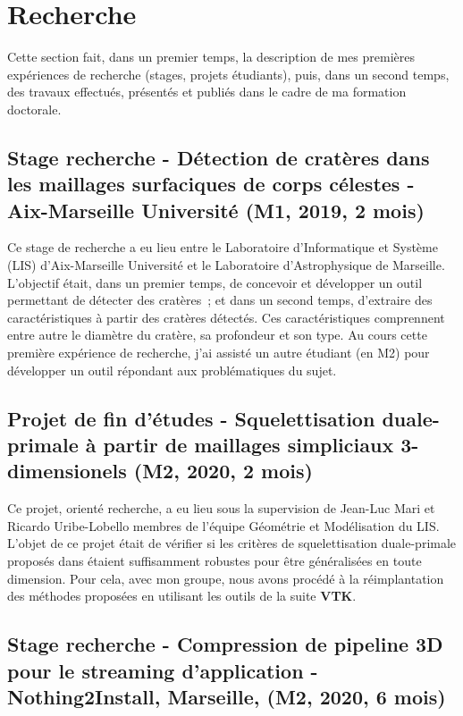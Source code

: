 \documentclass[11pt,a4paper,oneside]{article}
\begin{document}
\section{Recherche}

Cette section fait, dans un premier temps, la description de mes premières
expériences de recherche (stages, projets étudiants), puis, dans un second
temps, des travaux effectués, présentés et publiés dans le cadre de ma formation
doctorale. %

\subsection{Stage recherche - Détection de cratères dans les maillages
	surfaciques de corps célestes - Aix-Marseille Université (M1, 2019, 2 mois)}

Ce stage de recherche a eu lieu entre le Laboratoire d'Informatique et Système
(LIS) d'Aix-Marseille Université et le Laboratoire d'Astrophysique de
Marseille. %
L'objectif était, dans un premier temps, de concevoir et développer un outil
permettant de détecter des cratères~; et dans un second temps, d'extraire des
caractéristiques à partir des cratères détectés. %
Ces caractéristiques comprennent entre autre le diamètre du cratère, sa
profondeur et son type. %
Au cours cette première expérience de recherche, j'ai assisté un autre étudiant
(en M2) pour développer un outil répondant aux problématiques du sujet. %

\subsection{Projet de fin d'études - Squelettisation duale-primale à partir de
	maillages simpliciaux 3-dimensionels (M2, 2020, 2 mois)}

Ce projet, orienté recherche, a eu lieu sous la supervision de Jean-Luc Mari et Ricardo
Uribe-Lobello membres de l'équipe Géométrie et Modélisation du LIS. %
L'objet de ce projet était de vérifier si les critères de squelettisation
duale-primale proposés dans \cite{URI2019Dual} étaient suffisamment robustes
pour être généralisées en toute dimension. %
Pour cela, avec mon groupe, nous avons procédé à la réimplantation des méthodes
proposées en utilisant les outils de la suite \textbf{VTK}.

\subsection{Stage recherche - Compression de pipeline 3D pour le streaming d'application - Nothing2Install, Marseille, (M2, 2020, 6 mois)}
\end{document}

